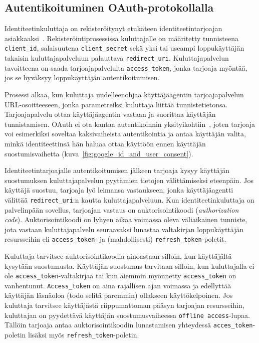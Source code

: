 \documentclass[finnish,gradu]{tktltiki}
\begin{document}


  \subsection{Autentikoituminen OAuth-protokollalla} %
  \label{ssub:autentikoituminen_oauth_protokollalla}

  Identiteetinkuluttaja on rekisteröitynyt etukäteen identiteetintarjoajan asiakkaaksi~\cite{google_oauth2_doc, facebook_oauth2_doc}. Rekisteröintiprosessissa kuluttajalle on määritetty tunnisteena \verb!client_id!, salaisuutena \verb!client_secret! sekä yksi tai useampi loppukäyttäjän takaisin kuluttajapalveluun palauttava \verb!redirect_uri!. Kuluttajapalvelun tavoitteena on saada tarjoajapalvelulta \verb!access_token!, jonka tarjoaja myöntää, jos se hyväksyy loppukäyttäjän autentikoitumisen.

  Prosessi alkaa, kun kuluttaja uudelleenohjaa käyttäjäagentin tarjoajapalvelun URL-osoitteeseen, jonka parametreiksi kuluttaja liittää tunnistetietonsa. Tarjoajapalvelu ottaa käyttäjäagentin vastaan ja suorittaa käyttäjän tunnistamisen. OAuth ei ota kantaa autentikoinnin yksityikohtiin~\cite{ietf_oauth2}, joten tarjoaja voi esimerkiksi soveltaa kaksivaiheista autentikointia ja antaa käyttäjän valita, minkä identiteettinsä hän haluaa ottaa käyttöön ennen käyttäjän suostumisvaihetta (kuva~\ref{fig:google_id_and_user_consent}).

  Identiteetintarjoajalle autentikoitumisen jälkeen tarjoaja kysyy käyttäjän suostumuksen kuluttajapalvelun pyytämien tietojen välittämiseksi eteenpäin. Jos käyttäjä suostuu, tarjoaja lyö leimansa vastaukseen, jonka käyttäjäagentti välittää \verb!redirect_uri!:n kautta kuluttajapalveluun. Kun identiteetinkuluttaja on palvelinpään sovellus, tarjoajan vastaus on auktorisointikoodi (\emph{authorization code}). Auktorisointikoodi on lyhyen aikaa voimassa oleva väliaikainen tunniste, jota vastaan kuluttajapalvelu seuraavaksi lunastaa valtakirjan loppukäyttäjän resursseihin eli \verb!access_token!- ja (mahdollisesti) \verb!refresh_token!-poletit. %

  Kuluttaja tarvitsee auktorisointikoodia ainoastaan silloin, kun käyttäjältä kysytään suostumusta. Käyttäjän suostumus tarvitaan silloin, kun kuluttajalla ei ole \verb!access_token!-valtakirjaa tai kun aiemmin myönnetty \verb!access_token! on vanhentunut. \verb!Access_token! on aina rajallisen ajan voimassa ja edellyttää käyttäjän läsnäoloa (todo selitä paremmin) ollakseen käyttökelpoinen. Jos kuluttaja tarvitsee käyttäjästä riippumattoman pääsyn tarjoajan resursseihin, kuluttajan on pyydettävä käyttäjän suostumusvaiheessa \verb!offline access!-lupaa. Tällöin tarjoaja antaa auktorisointikoodin lunastamisen yhteydessä \verb!acces_token!-poletin lisäksi myös \verb!refresh_token!-poletin.
\end{document}
